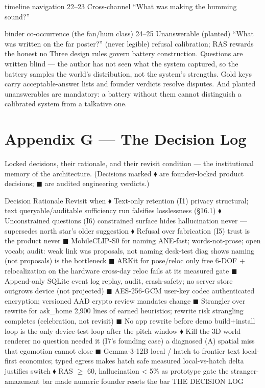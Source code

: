 timeline navigation 22--23 Cross-channel ``What was making the humming sound?''

binder co-occurrence (the fan/hum class) 24--25 Unanswerable (planted) ``What was written on the far poster?'' (never legible) refusal calibration; RAS rewards the honest no Three design rules govern battery construction. Questions are written blind --- the author has not seen what the system captured, so the battery samples the world's distribution, not the system's strengths. Gold keys carry acceptable-answer lists and founder verdicts resolve disputes. And planted unanswerables are mandatory: a battery without them cannot distinguish a calibrated system from a talkative one.

\chapter*{Appendix G --- The Decision Log}\label{appendix-g-the-decision-log}

Locked decisions, their rationale, and their revisit condition --- the institutional memory of the architecture. (Decisions marked \(\blacklozenge\) are founder-locked product decisions; \(\blacksquare\) are audited engineering verdicts.)

Decision Rationale Revisit when \(\blacklozenge\) Text-only retention (I1) privacy structural; text queryable/auditable sufficiency run falsifies losslessness (\S{}16.1) \(\blacklozenge\) Unconstrained questions (I6) constrained surface hides hallucination never --- supersedes north star's older suggestion \(\blacklozenge\) Refusal over fabrication (I5) trust is the product never \(\blacksquare\) MobileCLIP-S0 for naming ANE-fast; words-not-prose; open vocab; audit: weak link was proposals, not naming desk-test diag shows naming (not proposals) is the bottleneck \(\blacksquare\) ARKit for pose/reloc only free 6-DOF + relocalization on the hardware cross-day reloc fails at its measured gate \(\blacksquare\) Append-only SQLite event log replay, audit, crash-safety; no server store outgrows device (not projected) \(\blacksquare\) AES-256-GCM user-key codec authenticated encryption; versioned AAD crypto review mandates change \(\blacksquare\) Strangler over rewrite for ask\_home 2,900 lines of earned heuristics; rewrite risk strangling completes (celebration, not revisit) \(\blacksquare\) No app rewrite before demo build+install loop is the only device-test loop after the pitch window \(\blacklozenge\) Kill the 3D world renderer no question needed it (I7's founding case) a diagnosed (A) spatial miss that egomotion cannot close \(\blacksquare\) Gemma-3-12B local / hatch to frontier text local-first economics; typed egress makes hatch safe measured local-vs-hatch delta justifies switch \(\blacklozenge\) RAS \(\geq\) 60, hallucination \textless{} 5\% as prototype gate the stranger-amazement bar made numeric founder resets the bar THE DECISION LOG

